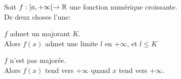\documentclass[12pt,twoside,a4paper]{article}
\begin{document}
		\begin{prop}
			Soit $f:[a,+\infty[\rightarrow \mathbb{R}$ une fonction numérique croissante.\\
			De deux choses l'une:
			\begin{liste}
				\item $f$ admet un majorant $K$.\\
					Alors $f(x)$ admet une limite $l$ en $+\infty$, et $l\leqslant K$
				\item $f$ n'est pas majorée.\\
					Alors $f(x)$ tend vers $+\infty$ quand $x$ tend vers $+\infty$.
			\end{liste}
		\end{prop}
\end{document}
